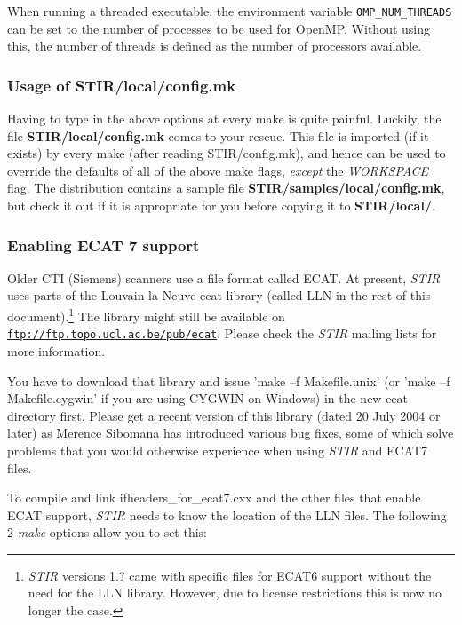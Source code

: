 \documentclass{article}
\def\R2Lurl#1#2{\mbox{\href{#1}{\tt #2}}}
\begin{document}
When running a threaded executable, the environment variable \texttt{OMP\_NUM\_THREADS} can be set
to the number of processes to be used for OpenMP. Without using this, the number of threads is 
defined as the number of processors available.

\subsubsection{
Usage of STIR/local/config.mk}
\label{sec:local_config.mk}

Having to type in the above options at every make is quite painful. 
Luckily, the file \textbf{STIR/local/config.mk} comes to your rescue. 
This file is imported (if it exists) by every make (after reading 
STIR/config.mk), and hence can be used to override the defaults 
of all of the above make flags, \textit{except} the \textit{WORKSPACE} flag. 
The distribution contains a sample file \textbf{STIR/samples/local/config.mk}, 
but check it out if it is appropriate for you before copying 
it to \textbf{STIR/local/}.

\subsubsection{
Enabling ECAT 7 support}
\label{sec:ECAT67support}
Older CTI (Siemens) scanners use a file format called ECAT.
At present, \textit{STIR} uses parts of the Louvain la Neuve ecat library (called LLN in
the rest of this document).\footnote{\textit{STIR} versions 1.? came with
specific files for ECAT6 support without the need for the LLN library. 
However, due to license restrictions this is now no longer the case.} 
The library might still be available on  
\R2Lurl{ftp://ftp.topo.ucl.ac.be/pub/ecat }{ftp://ftp.topo.ucl.ac.be/pub/ecat}.
Please check the \textit{STIR}
mailing lists for more information.

You have to download that library and issue 'make --f Makefile.unix' 
(or 'make --f Makefile.cygwin' if you are using CYGWIN on Windows) 
in the new ecat directory first. Please get a recent version 
of this library (dated 20 July 2004 or later) as Merence Sibomana 
has introduced various bug fixes, some of which solve problems 
that you would otherwise experience when using \textit{STIR} and ECAT7 
files.


To compile and link ifheaders\_for\_ecat7.cxx and the other files 
that enable ECAT support, \textit{STIR} needs to know the location 
of the LLN files. The following 2 \textit{make} options allow you 
to set this:
\end{document}
